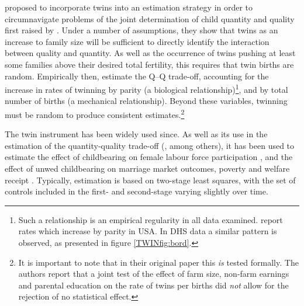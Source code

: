 \documentclass[subeqn]{article}
\begin{document}
\begin{spacing}{1.4}
\citet{RosenzweigWolpin1980} proposed to incorporate twins into an estimation
strategy in order to circumnavigate problems of the joint determination of child 
quantity and quality first raised by \citet{Becker1960,BeckerLewis1973,
BeckerTomes1976}.  Under a number of assumptions, they show that twins as an 
increase to family size will be sufficient to directly identify the interaction
between quality and quantity.  As well as the occurrence of twins pushing at
least some families above their desired total fertility, this requires that 
twin births are random.  Empirically then, \citet{RosenzweigWolpin1980} estimate 
the Q--Q trade-off, accounting for the increase in rates of twinning by parity 
(a biological relationship)\footnote{Such a relationship is an empirical 
regularity in all data examined. \citet{RosenzweigWolpin1980} report rates which 
increase by parity in USA.  In DHS data a similar pattern is observed, as 
presented in figure \ref{TWINfig:bord}.}, and by total number of births (a 
mechanical relationship).  Beyond these variables, twinning must be random to
produce consistent estimates.\footnote{It is important to note that in their
original paper this \emph{is} tested formally.  The authors report that a joint
test of the effect of farm size, non-farm earnings and parental education on the
rate of twins per births did \emph{not} allow for the rejection of no 
statistical effect.}

The twin instrument has been widely used since.  As well as its use in the 
estimation of the quantity-quality trade-off (\citet{RosenzweigWolpin1980, 
Blacketal2005, Angristetal2010, Caceres2006}, among others), it has been used to
estimate the effect of childbearing on female labour force participation 
\citep{RosenzweigWolpin1980b,Jacobsenetal1999,AngristEvans1998}, and the effect 
of unwed childbearing on marriage market outcomes, poverty and welfare receipt 
\citep{BronarsGrogger1994}.  Typically, estimation is based on two-stage least
squares, with the set of controls included in the first- and second-stage 
varying slightly over time.


\end{spacing}
\end{document}
